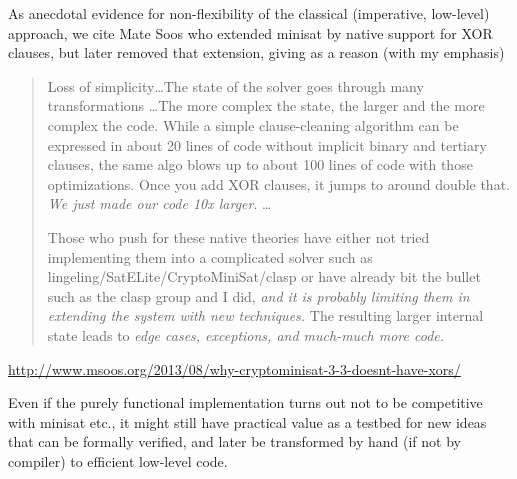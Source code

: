 As anecdotal evidence for non-flexibility of the classical 
(imperative, low-level) approach, we cite Mate Soos 
who extended minisat by native support for XOR clauses,
but later removed that extension, giving as a reason (with my emphasis)
\begin{quote}
  Loss of simplicity\dots The state of the solver goes through many transformations
  \dots The more complex the state, the larger and the more complex the code. 
  While a simple clause-cleaning algorithm can be expressed in about 20 lines of code 
  without implicit binary and tertiary clauses, 
  the same algo blows up to about 100 lines of code with those optimizations. 
  Once you add XOR clauses, it jumps to around double that. 
  \emph{We just made our code 10x larger}. \dots

  Those who push for these native theories have either not tried implementing them 
  into a complicated solver such as lingeling/SatELite/CryptoMiniSat/clasp 
  or have already bit the bullet such as the clasp group and I did, 
  \emph{and it is probably limiting them in extending the system with new techniques.} 
  The resulting larger internal state leads to 
  \emph{edge cases, exceptions, 
  and much-much more code.}
\end{quote}
\url{http://www.msoos.org/2013/08/why-cryptominisat-3-3-doesnt-have-xors/}

Even if the purely functional implementation turns out not to be competitive
with minisat etc., it might still have practical value as a testbed for new ideas
that can be formally verified, and later be transformed by hand (if not by compiler)
to efficient low-level code.

